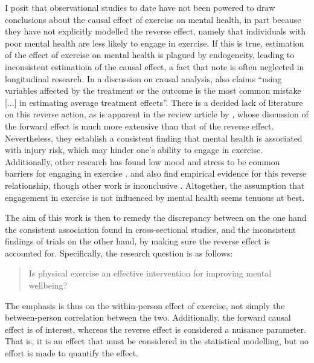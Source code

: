 I posit that observational studies to date have not been powered to draw conclusions about the causal effect
of exercise on mental health, in part because they have not explicitly modelled the reverse effect, namely that individuals with poor
mental health are less likely to engage in exercise. If this is true, estimation of the effect of exercise on mental health is
plagued by endogeneity, leading to inconsistent estimatioin of the causal effect, a fact that  note is often neglected in
longitudinal research. In a discussion on causal analysis,  also claims ``using variables affected by
the treatment or the outcome is the most common mistake [...] in estimating average treatment effects''.
There is a decided lack of literature on this reverse action, as is apparent in the review article by ,
whose discussion of the forward effect is much more extensive than that of the reverse effect.
Nevertheless, they establish a consistent finding that mental health is associated with injury risk, which may hinder
one's ability to engage in exercise. Additionally, other research has found low mood and stress to be common barriers for
engaging in exercise \cite{firth2016motivating}.
 and  also find empirical evidence for this reverse relationship,
though other work is inconclusive \cite{birkeland2009longitudinal, ku2012physical}. Altogether, the assumption that engagement
in exercise is not influenced by mental health seems tenuous at best.

The aim of this work is then to remedy the discrepancy between on the one hand the consistent association found in
cross-sectional studies, and the inconsistent findings of trials on the other hand, by making sure the reverse effect
is accounted for.
Specifically, the research question is as follows:
\begin{quote}
    Is physical exercise an effective intervention for improving mental wellbeing?
\end{quote}
The emphasis is thus on the within-person effect of exercise, not simply the between-person correlation between the two.
Additionally, the forward causal effect is of interest, whereas the reverse effect is considered a nuisance parameter.
That is, it is an effect that must be considered in the statistical modelling, but no effort is made to quantify
the effect.


